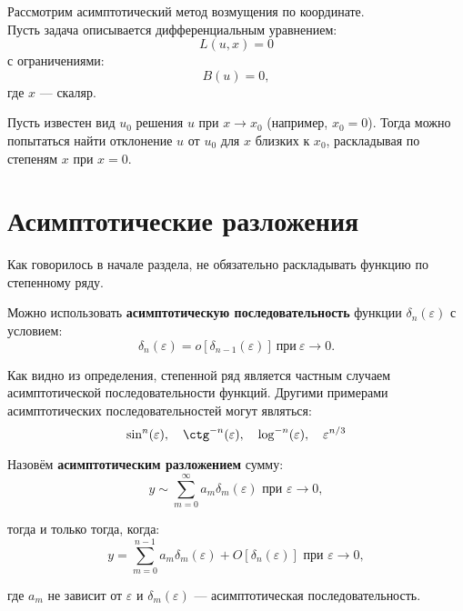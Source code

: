 Рассмотрим асимптотический метод возмущения по координате.\\
Пусть задача описывается дифференциальным уравнением:
\begin{equation*}
    L(u, x) = 0
\end{equation*}
с ограничениями:
\begin{equation*}
    B(u) = 0,
\end{equation*}
где $x$ --- скаляр.

Пусть известен вид $u_0$ решения $u$
при $x \to x_0$ (например, $x_0 = 0$).
Тогда можно попытаться найти отклонение $u$ от $u_0$
для $x$ близких к $x_0$,
раскладывая по степеням $x$ при $x = 0$.

\section*{Асимптотические разложения}

Как говорилось в начале раздела,
не обязательно раскладывать функцию по степенному ряду.

Можно использовать \textbf{асимптотическую последовательность} функции
$\delta_n(\varepsilon)$ с условием:
\begin{equation*}
    \delta_n(\varepsilon) = o[\delta_{n-1}(\varepsilon)] \
    \text{при}\ \varepsilon \to 0.
\end{equation*}

Как видно из определения,
степенной ряд является частным случаем
асимптотической последовательности функций.
Другими примерами асимптотических последовательностей могут являться:
\begin{equation*}
    \sin^n(\varepsilon), \quad \ctg^{-n}(\varepsilon), \quad
    \log^{-n}(\varepsilon), \quad \varepsilon^{n/3}
\end{equation*}

Назовём \textbf{асимптотическим разложением} сумму:
\begin{equation*}
    y \sim \sum_{m=0}^\infty a_m \delta_m(\varepsilon)
    \text{ при } \varepsilon \to 0,
\end{equation*}

тогда и только тогда, когда:
\begin{equation*}
    y = \sum_{m=0}^{n-1} a_m \delta_m(\varepsilon)
    + O[\delta_n(\varepsilon)]
    \text{ при } \varepsilon \to 0,
\end{equation*}

где $a_m$ не зависит от $\varepsilon$
и $\delta_m(\varepsilon)$ --- асимптотическая последовательность.


